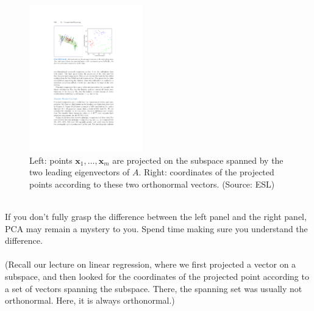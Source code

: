 \documentclass[11pt]{article}
\newcommand{\V}[1]{\mathbf{#1}}
\begin{document}
\begin{figure}[H]
  \centering
  \includegraphics[height=2.5in]{pca_proj_colors.pdf}    
  \caption{Left: points $\V{x}_1,\ldots,\V{x}_m$ are projected on the 
  subspace spanned by the two leading eigenvectors of $A$. Right: coordinates of
the projected points according to these two orthonormal vectors. (Source: ESL)}
\end{figure}
~\\
If you don't fully grasp the difference between the left panel and the right panel,
PCA may remain a mystery to you. Spend time making sure you understand the
difference.
\\~\\
(Recall our lecture on linear regression, where we first projected a vector on a
subspace, and then looked for the coordinates of the projected point according
to a set of vectors spanning the subspace. There, the spanning set was usually
not orthonormal. Here, it is always orthonormal.)
\end{document}

